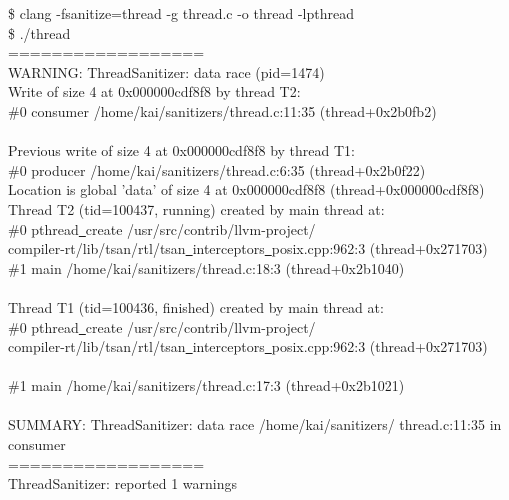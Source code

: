 \begin{tcolorbox}[colback=white,colframe=black]
\$ clang -fsanitize=thread -g thread.c -o thread -lpthread \\
\$ ./thread \\
================== \\
WARNING: ThreadSanitizer: data race (pid=1474) \\
\hspace*{0.5cm}Write of size 4 at 0x000000cdf8f8 by thread T2: \\
\hspace*{1cm}\#0 consumer /home/kai/sanitizers/thread.c:11:35 
(thread+0x2b0fb2) \\
\\
\hspace*{0.5cm}Previous write of size 4 at 0x000000cdf8f8 by thread T1: \\
\hspace*{1cm}\#0 producer /home/kai/sanitizers/thread.c:6:35 
(thread+0x2b0f22)
\\
\hspace*{0.5cm}Location is global 'data' of size 4 at 0x000000cdf8f8 
(thread+0x000000cdf8f8)
\\
\hspace*{0.5cm}Thread T2 (tid=100437, running) created by main thread at: \\
\hspace*{1cm}\#0 pthread\underline{~}create /usr/src/contrib/llvm-project/ \\
compiler-rt/lib/tsan/rtl/tsan\underline{~}interceptors\underline{~}posix.cpp:962:3 
(thread+0x271703) \\
\hspace*{1cm}\#1 main /home/kai/sanitizers/thread.c:18:3 
(thread+0x2b1040) \\
\\
\hspace*{0.5cm}Thread T1 (tid=100436, finished) created by main  thread at: \\
\hspace*{1cm}\#0 pthread\underline{~}create  /usr/src/contrib/llvm-project/ \\
compiler-rt/lib/tsan/rtl/tsan\underline{~}interceptors\underline{~}posix.cpp:962:3 
(thread+0x271703) \\
\\
\hspace*{1cm}\#1 main /home/kai/sanitizers/thread.c:17:3 
(thread+0x2b1021) \\
\\
SUMMARY: ThreadSanitizer: data race /home/kai/sanitizers/ 
thread.c:11:35 in consumer \\
================== \\
ThreadSanitizer: reported 1 warnings
\end{tcolorbox}

